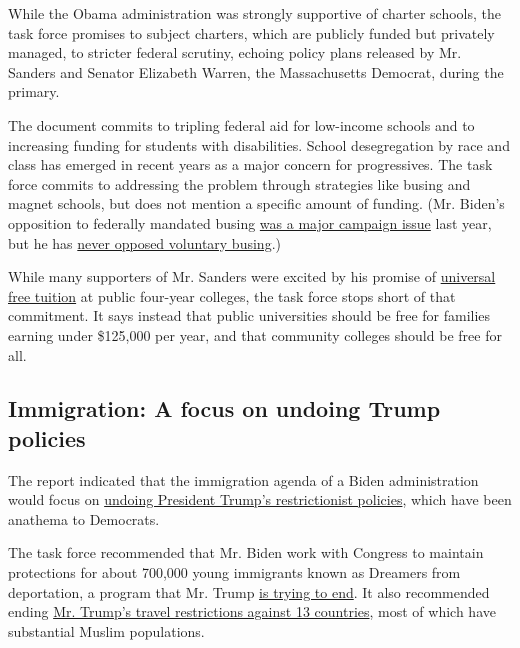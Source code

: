 While the Obama administration was strongly supportive of charter
schools, the task force promises to subject charters, which are publicly
funded but privately managed, to stricter federal scrutiny, echoing
policy plans released by Mr. Sanders and Senator Elizabeth Warren, the
Massachusetts Democrat, during the primary.

The document commits to tripling federal aid for low-income schools and
to increasing funding for students with disabilities. School
desegregation by race and class has emerged in recent years as a major
concern for progressives. The task force commits to addressing the
problem through strategies like busing and magnet schools, but does not
mention a specific amount of funding. (Mr. Biden's opposition to
federally mandated busing
\href{https://www.nytimes3xbfgragh.onion/2019/07/05/us/politics/biden-harris-busing-cnn.html}{was
a major campaign issue} last year, but he has
\href{https://www.nytimes3xbfgragh.onion/2019/07/15/us/politics/biden-busing.html}{never
opposed voluntary busing}.)

While many supporters of Mr. Sanders were excited by his promise of
\href{https://www.nytimes3xbfgragh.onion/2019/12/06/us/politics/buttigieg-sanders-warren-free-tuition.html}{universal
free tuition} at public four-year colleges, the task force stops short
of that commitment. It says instead that public universities should be
free for families earning under \$125,000 per year, and that community
colleges should be free for all.

\hypertarget{immigration-a-focus-on-undoing-trump-policies}{%
\subsection{Immigration: A focus on undoing Trump
policies}\label{immigration-a-focus-on-undoing-trump-policies}}

The report indicated that the immigration agenda of a Biden
administration would focus on
\href{https://www.nytimes3xbfgragh.onion/2019/12/11/us/politics/joe-biden-immigration.html}{undoing
President Trump's restrictionist policies}, which have been anathema to
Democrats.

The task force recommended that Mr. Biden work with Congress to maintain
protections for about 700,000 young immigrants known as Dreamers from
deportation, a program that Mr. Trump
\href{https://www.nytimes3xbfgragh.onion/2020/06/19/us/politics/trump-daca.html}{is
trying to end}. It also recommended ending
\href{https://www.nytimes3xbfgragh.onion/2020/01/31/us/politics/trump-travel-ban.html}{Mr.
Trump's travel restrictions against 13 countries}, most of which have
substantial Muslim populations.

